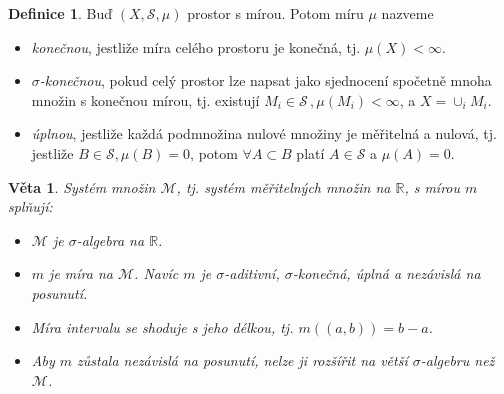 \documentclass[a4]{report}
\newtheorem{theorem}{Věta}
\theoremstyle{definition}
\newtheorem{definition}{Definice}[section]
\begin{document}
{\begin{definition}
Buď $(X, \mathscr{S}, \mu)$ prostor s mírou. Potom míru $\mu$ nazveme
\begin{itemize}
\item \textit{konečnou}, jestliže míra celého prostoru je  konečná, tj. $\mu(X)<\infty$.
\item $\sigma$\textit{-konečnou}, pokud celý prostor lze napsat jako sjednocení spočetně mnoha množin s konečnou mírou, tj. existují $M_i\in \mathscr{S}\,,\mu(M_i)<\infty$, a $X=\cup_i M_i.$
\item \textit{úplnou}, jestliže každá podmnožina nulové množiny je měřitelná a nulová, tj. jestliže $B\in\mathscr{S}, \mu(B)=0$, potom $\forall A\subset B$ platí $A\in \mathscr{S}$ a $\mu(A)=0.$
\end{itemize}
\end{definition}
\begin{theorem}
Systém množin $\mathscr{M}$, tj. systém měřitelných množin na $\mathbb{R}$, s mírou $m$ splňují: 
\begin{itemize}
\item $\mathscr{M}$  je $\sigma$-algebra na $\mathbb{R}$.
\item $m$ je míra na $\mathscr{M}$. Navíc $m$ je $\sigma$-aditivní, $\sigma$-konečná, úplná a nezávislá na posunutí. 
\item Míra intervalu se shoduje s jeho délkou, tj. $m((a,b))=b-a$.
\item Aby $m$ zůstala nezávislá na posunutí, nelze ji rozšířit na větší $\sigma$-algebru než $\mathscr{M}$.
\end{itemize} 
\end{theorem}
}
\end{document}
